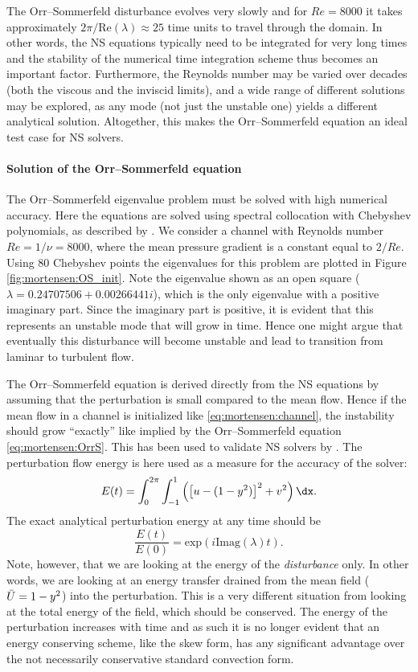 The Orr--Sommerfeld disturbance evolves very slowly and for $Re=8000$ it
takes approximately $2 \pi/\text{Re}(\lambda)\approx 25$ time units to
travel through the domain. In other words, the NS equations typically need
to be integrated for very long times and the stability of the numerical
time integration scheme thus becomes an important factor. Furthermore,
the Reynolds number may be varied over decades (both the viscous and the
inviscid limits), and a wide range of different solutions may be explored,
as any mode (not just the unstable one) yields a different analytical
solution. Altogether, this makes the Orr--Sommerfeld equation an ideal
test case for NS solvers.

\paragraph{Solution of the Orr--Sommerfeld equation}

The Orr--Sommerfeld eigenvalue problem must be solved with high numerical
accuracy. Here the equations are solved using spectral collocation
with Chebyshev polynomials, as described by \citet{Trefethen2006}. We
consider a channel with Reynolds number $Re=1/\nu=8000$, where
the mean pressure gradient is a constant equal to $2/Re$. Using 80
Chebyshev points the eigenvalues for this problem are plotted in Figure
\ref{fig:mortensen:OS_init}. Note the eigenvalue shown as an open
square ($\lambda =
0.24707506 + 0.00266441 i$), which is the only eigenvalue with a positive
imaginary part. Since the imaginary part is positive, it is evident that
this represents an unstable mode that will grow in time.
Hence one might argue that eventually this disturbance will become
unstable and lead to transition from laminar to turbulent flow.

The Orr--Sommerfeld equation is derived directly from the NS equations
by assuming that the perturbation is small compared to the mean
flow. Hence if the mean flow in a channel is initialized like
\eqref{eq:mortensen:channel}, the instability should grow ``exactly''
like implied by the Orr--Sommerfeld equation
\eqref{eq:mortensen:OrrS}. This has been used to validate NS solvers
by \citet{MalikZangHussaini1984}. The perturbation flow energy is here
used as a measure for the accuracy of the solver:
\begin{equation}
  E(t)= \int_0^{2\pi}\int_{-1}^{1} \left( \left[u-(1-y^2)\right]^2
    + v^2 \right) \dx.
\end{equation}
The exact analytical perturbation energy at any time should be
\begin{equation}
 \frac{E(t)}{E(0)}=\text{exp}(i \text{Imag}(\lambda) t).
\end{equation}
Note, however, that we are looking at the energy of the
\textit{disturbance} only. In other words, we are looking at an
energy transfer drained from the mean field ($\Bar{U}=1-y^2$) into
the perturbation. This is a very different situation from looking at
the total energy of the field, which should be conserved. The energy of
the perturbation increases with time and as such it is no longer evident
that an energy conserving scheme, like the skew form, has any significant
advantage over the not necessarily conservative standard convection form.

